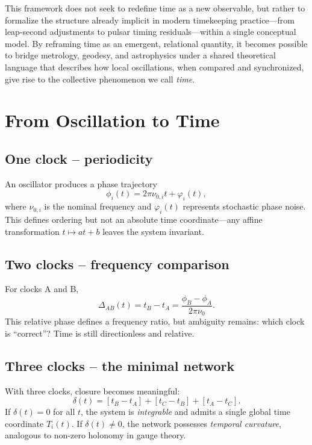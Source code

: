 \documentclass[11pt,a4paper]{article}
\begin{document}
This framework does not seek to redefine time as a new observable, but rather to formalize the structure already implicit in modern timekeeping practice—from leap-second adjustments to pulsar timing residuals—within a single conceptual model. 
By reframing time as an emergent, relational quantity, it becomes possible to bridge metrology, geodesy, and astrophysics under a shared theoretical language that describes how local oscillations, when compared and synchronized, give rise to the collective phenomenon we call \emph{time}.
\section{From Oscillation to Time}

\subsection{One clock – periodicity}
An oscillator produces a phase trajectory
\begin{equation}
\phi_i(t) = 2\pi\nu_{0,i} t + \varphi_i(t),
\end{equation}
where $\nu_{0,i}$ is the nominal frequency and $\varphi_i(t)$ represents stochastic phase noise. 
This defines ordering but not an absolute time coordinate—any affine transformation $t \mapsto at+b$ leaves the system invariant.

\subsection{Two clocks – frequency comparison}
For clocks A and B,
\begin{equation}
\Delta_{AB}(t) = t_B - t_A = \frac{\phi_B - \phi_A}{2\pi\nu_0}.
\end{equation}
This relative phase defines a frequency ratio, but ambiguity remains: which clock is ``correct''? 
Time is still directionless and relative.

\subsection{Three clocks – the minimal network}
With three clocks, closure becomes meaningful:
\begin{equation}
\delta(t) = [t_B - t_A] + [t_C - t_B] + [t_A - t_C].
\end{equation}
If $\delta(t)=0$ for all $t$, the system is \emph{integrable} and admits a single global time coordinate $T_i(t)$. 
If $\delta(t)\neq 0$, the network possesses \emph{temporal curvature}, analogous to non-zero holonomy in gauge theory.
\end{document}
